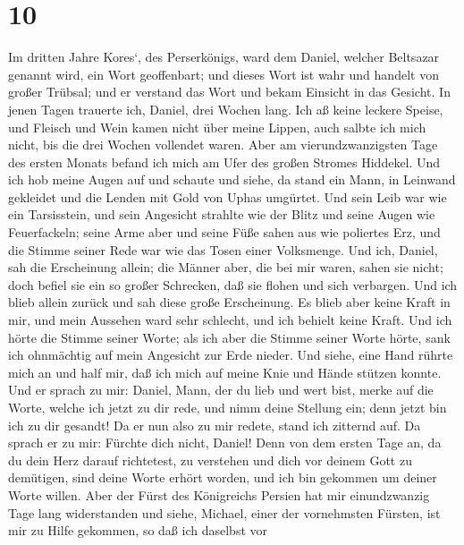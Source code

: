 \hypertarget{section-9}{%
\section{10}\label{section-9}}

 Im dritten Jahre Kores`, des Perserkönigs, ward dem
Daniel, welcher Beltsazar genannt wird, ein Wort geoffenbart; und dieses
Wort ist wahr und handelt von großer Trübsal; und er verstand das Wort
und bekam Einsicht in das Gesicht.  In jenen Tagen
trauerte ich, Daniel, drei Wochen lang.  Ich aß keine
leckere Speise, und Fleisch und Wein kamen nicht über meine Lippen, auch
salbte ich mich nicht, bis die drei Wochen vollendet waren.
 Aber am vierundzwanzigsten Tage des ersten Monats befand
ich mich am Ufer des großen Stromes Hiddekel.  Und ich hob
meine Augen auf und schaute und siehe, da stand ein Mann, in Leinwand
gekleidet und die Lenden mit Gold von Uphas umgürtet.  Und
sein Leib war wie ein Tarsisstein, und sein Angesicht strahlte wie der
Blitz und seine Augen wie Feuerfackeln; seine Arme aber und seine Füße
sahen aus wie poliertes Erz, und die Stimme seiner Rede war wie das
Tosen einer Volksmenge.  Und ich, Daniel, sah die
Erscheinung allein; die Männer aber, die bei mir waren, sahen sie nicht;
doch befiel sie ein so großer Schrecken, daß sie flohen und sich
verbargen.  Und ich blieb allein zurück und sah diese
große Erscheinung. Es blieb aber keine Kraft in mir, und mein Aussehen
ward sehr schlecht, und ich behielt keine Kraft.  Und ich
hörte die Stimme seiner Worte; als ich aber die Stimme seiner Worte
hörte, sank ich ohnmächtig auf mein Angesicht zur Erde nieder.
 Und siehe, eine Hand rührte mich an und half mir, daß
ich mich auf meine Knie und Hände stützen konnte.  Und er
sprach zu mir: Daniel, Mann, der du lieb und wert bist, merke auf die
Worte, welche ich jetzt zu dir rede, und nimm deine Stellung ein; denn
jetzt bin ich zu dir gesandt! Da er nun also zu mir redete, stand ich
zitternd auf.  Da sprach er zu mir: Fürchte dich nicht,
Daniel! Denn von dem ersten Tage an, da du dein Herz darauf richtetest,
zu verstehen und dich vor deinem Gott zu demütigen, sind deine Worte
erhört worden, und ich bin gekommen um deiner Worte willen.
 Aber der Fürst des Königreichs Persien hat mir
einundzwanzig Tage lang widerstanden und siehe, Michael, einer der
vornehmsten Fürsten, ist mir zu Hilfe gekommen, so daß ich daselbst vor
